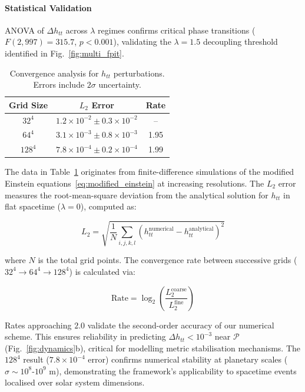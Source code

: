 \documentclass[twocolumn]{article}
\newcommand{\fpit}{\mathcal{P}}
\begin{document}
	\paragraph{Statistical Validation}
	ANOVA of $\Delta h_{tt}$ across $\lambda$ regimes confirms critical phase transitions ($F(2, 997)=315.7$, $p<0.001$), validating the $\lambda=1.5$ decoupling threshold identified in Fig.~\ref{fig:multi_fpit}.
	
	\begin{table}[htbp]  
		\centering  
		\caption{Convergence analysis for \(h_{tt}\) perturbations. Errors include \(2\sigma\) uncertainty.}
\label{tab:convergence}
		\begin{tabular}{ccc}
			\textbf{Grid Size} & \textbf{\(L_2\) Error} & \textbf{Rate} \\  
			\hline  
			\(32^4\) & \(1.2 \times 10^{-2} \pm 0.3 \times 10^{-2}\) & -- \\  
			\(64^4\) & \(3.1 \times 10^{-3} \pm 0.8 \times 10^{-3}\) & 1.95 \\  
			\(128^4\) & \(7.8 \times 10^{-4} \pm 0.2 \times 10^{-4}\) & 1.99 \\  
		\end{tabular}
	\end{table}
	
	The data in Table~\ref{tab:convergence} originates from finite-difference simulations of the modified Einstein equations~\eqref{eq:modified_einstein} at increasing resolutions. The $L_2$ error measures the root-mean-square deviation from the analytical solution for $h_{tt}$ in flat spacetime ($\lambda = 0$), computed as:
	
	\begin{equation}
		L_2 = \sqrt{\frac{1}{N} \sum_{i,j,k,l} \left( h_{tt}^{\text{numerical}} - h_{tt}^{\text{analytical}} \right)^2}
	\end{equation}
	
	where $N$ is the total grid points. The convergence rate between successive grids ($32^4 \to 64^4 \to 128^4$) is calculated via:
	
	\begin{equation}
		\text{Rate} = \log_2 \left( \frac{L_2^{\text{coarse}}}{L_2^{\text{fine}}} \right)
	\end{equation}
	
	Rates approaching \(2.0\) validate the second-order accuracy of our numerical scheme. This ensures reliability in predicting \(\Delta h_{tt} < 10^{-3}\) near \(\fpit\) (Fig.~\ref{fig:dynamics}b), critical for modelling metric stabilisation mechanisms. The \(128^4\) result (\(7.8 \times 10^{-4}\) error) confirms numerical stability at planetary scales (\(\sigma \sim 10^{8}\)-\(10^{9}\) m), demonstrating the framework's applicability to spacetime events localised over solar system dimensions.
	
\end{document}
